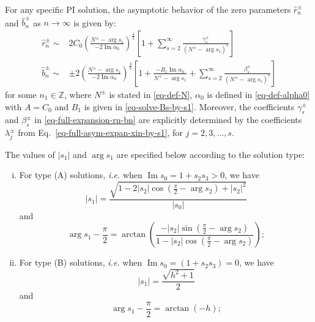 \documentclass[12pt]{article}
\theoremstyle{plain}
\newtheorem{corollary}{\hskip\parindent Corollary}
\theoremstyle{definition}
\numberwithin{equation}{section}
\renewcommand\Im{\operatorname{Im}}
\begin{document}
\begin{corollary}\label{cor-connection-PI-zero-data}
For any specific PI solution, the asymptotic behavior of the zero parameters \( \hat{r}_{n}^{\pm} \) and \( \hat{b}_{n}^{\pm} \) as \( n \to \infty \) is given by:
\begin{equation}\label{eq-full-expansion-rn-bn}
\begin{split}
\hat{r}_{n}^{\pm}\sim &2C_{0}\left(\frac{N^{\pm}-\arg{s_1}}{-2\Im\alpha_{0}}\right)^{\frac{4}{5}}\left[1+\sum\limits_{s=2}^{\infty}\frac{\gamma_{s}^{\pm}}{(N^{\pm}-\arg{s_1})^{s}}\right] \\
\hat{b}_{n}^{\pm}\sim &\pm2\left(\frac{N^{\pm}-\arg{s_1}}{-2\Im\alpha_{0}}\right)^{\frac{3}{5}}\left[1+\frac{-B_{1}\Im\alpha_{0}}{N^{\pm}-\arg{s_{1}}}+\sum\limits_{s=2}^{\infty}\frac{\beta_{s}^{\pm}}{(N^{\pm}-\arg{s_1})^{s}}\right]
\end{split}
\end{equation}
for some $n_{1}\in\mathbb{Z}$, where $N^{\pm}$ is stated in \eqref{eq-def-N}, $\alpha_{0}$ is defined in \eqref{eq-def-alpha0} with $A=C_{0}$ and $B_{1}$ is given in \eqref{eq-solve-Bs-by-s1}.
Moreover, the coefficients \( \gamma_{s}^{\pm} \) and \( \beta_{s}^{\pm} \) in \eqref{eq-full-expansion-rn-bn} are explicitly determined by the coefficients \( \lambda_{j}^{\pm} \) from Eq.~\eqref{eq-full-asym-expan-xin-by-s1}, for \( j = 2, 3, \dots, s \).

The values of \( |s_{1}| \) and \( \arg s_{1} \) are specified below according to the solution type:
\begin{enumerate}[(i)]
\item  For type (A) solutions, {\it i.e.} when $\Im s_{0}=1+s_{2}s_{3}>0$, we have
\begin{equation}\label{eq-|s1|-by-s2-A}
|s_{1}|=\frac{\sqrt{1-2|s_{2}|\cos(\frac{\pi}{2}-\arg{s_{2}})+|s_{2}|^2}}{|s_{0}|}
\end{equation}
and
\begin{equation}\label{eq-args1-by-s2-A}
\arg{s_{1}}-\frac{\pi}{2}=\arctan\left(\frac{-|s_{2}|\sin(\frac{\pi}{2}-\arg{s_{2}})}{1-|s_{2}|\cos(\frac{\pi}{2}-\arg{s_{2}})}\right);
\end{equation}

\item  For type (B) solutions, {\it i.e.} when $\Im s_{0}=(1+s_{2}s_{3})=0$, we have
\begin{equation}\label{eq-|s1|-by-h}
|s_{1}|=\frac{\sqrt{h^2+1}}{2}
\end{equation}
and
\begin{equation}\label{eq-args1-by-h}
\arg{s_{1}}-\frac{\pi}{2}=\arctan(-h);
\end{equation}


\end{enumerate}
\end{corollary}
\end{document}
